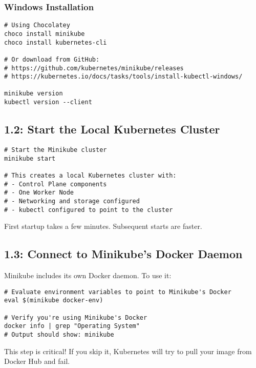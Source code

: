 \documentclass[12pt,a4paper]{article}
\begin{document}
\subsubsection{Windows Installation}

\begin{lstlisting}[caption=Install Minikube and kubectl on Windows]
# Using Chocolatey
choco install minikube
choco install kubernetes-cli

# Or download from GitHub:
# https://github.com/kubernetes/minikube/releases
# https://kubernetes.io/docs/tasks/tools/install-kubectl-windows/

minikube version
kubectl version --client
\end{lstlisting}

\subsection{1.2: Start the Local Kubernetes Cluster}

\begin{lstlisting}[caption=Start Minikube cluster]
# Start the Minikube cluster
minikube start

# This creates a local Kubernetes cluster with:
# - Control Plane components
# - One Worker Node
# - Networking and storage configured
# - kubectl configured to point to the cluster
\end{lstlisting}

\begin{tipbox}
First startup takes a few minutes. Subsequent starts are faster.
\end{tipbox}

\subsection{1.3: Connect to Minikube's Docker Daemon}

Minikube includes its own Docker daemon. To use it:

\begin{lstlisting}[caption=Connect to Minikube Docker]
# Evaluate environment variables to point to Minikube's Docker
eval $(minikube docker-env)

# Verify you're using Minikube's Docker
docker info | grep "Operating System"
# Output should show: minikube
\end{lstlisting}

\begin{importantbox}
This step is critical! If you skip it, Kubernetes will try to pull your image from Docker Hub and fail.
\end{importantbox}
\end{document}
